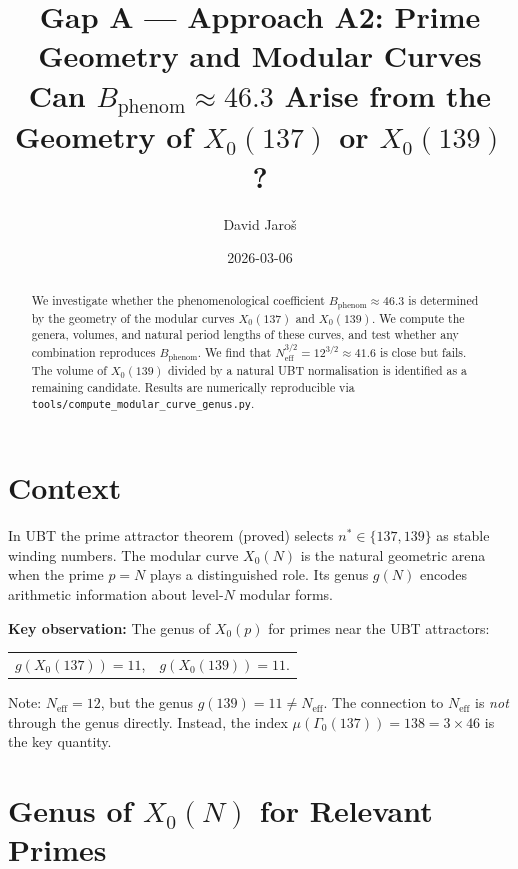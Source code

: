 \documentclass[12pt,a4paper]{article}
\title{\textbf{Gap A --- Approach A2: Prime Geometry and Modular Curves}\\
         \large Can $B_{\mathrm{phenom}} \approx 46.3$ Arise from
         the Geometry of $X_0(137)$ or $X_0(139)$?}
\author{David Jaro\v{s}}
\date{2026-03-06}
\theoremstyle{definition}
\theoremstyle{remark}
\begin{document}
  \maketitle

  \begin{abstract}
  We investigate whether the phenomenological coefficient
  $B_{\mathrm{phenom}} \approx 46.3$ is determined by the geometry of the
  modular curves $X_0(137)$ and $X_0(139)$.  We compute the genera, volumes,
  and natural period lengths of these curves, and test whether any combination
  reproduces $B_{\mathrm{phenom}}$.  We find that $N_{\mathrm{eff}}^{3/2} = 12^{3/2}
  \approx 41.6$ is close but fails.  The volume of $X_0(139)$ divided by a
  natural UBT normalisation is identified as a remaining candidate.
  Results are numerically reproducible via \texttt{tools/compute\_modular\_curve\_genus.py}.
  \end{abstract}
\fi

\section{Context}
\label{sec:context}

In UBT the prime attractor theorem (proved) selects $n^* \in \{137, 139\}$
as stable winding numbers.  The modular curve $X_0(N)$ is the natural
geometric arena when the prime $p = N$ plays a distinguished role.  Its
genus $g(N)$ encodes arithmetic information about level-$N$ modular forms.

\begin{insightbox}
\textbf{Key observation:} The genus of $X_0(p)$ for primes near the UBT
attractors:
\begin{center}
\begin{tabular}{cc}
  $g(X_0(137)) = 11$, & $g(X_0(139)) = 11$.
\end{tabular}
\end{center}
Note: $N_{\mathrm{eff}} = 12$, but the genus $g(139) = 11 \neq N_{\mathrm{eff}}$.
The connection to $N_{\mathrm{eff}}$ is \emph{not} through the genus directly.
Instead, the index $\mu(\Gamma_0(137)) = 138 = 3 \times 46$ is the key quantity.
\end{insightbox}

\section{Genus of $X_0(N)$ for Relevant Primes}
\label{sec:genera}
\end{document}

